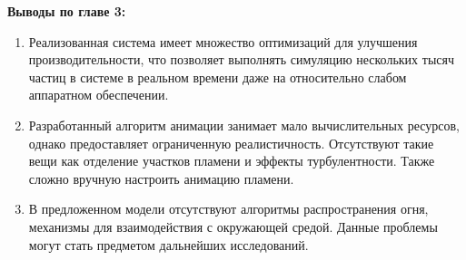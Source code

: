 \textbf{Выводы по главе 3:}
\begin{enumerate}
    \item Реализованная система имеет множество оптимизаций для улучшения
        производительности, что позволяет выполнять симуляцию нескольких тысяч
        частиц в системе в реальном времени даже на относительно слабом
        аппаратном обеспечении.
    \item Разработанный алгоритм анимации занимает мало вычислительных ресурсов,
        однако предоставляет ограниченную реалистичность. Отсутствуют такие вещи
        как отделение участков пламени и эффекты турбулентности. Также
        сложно вручную настроить анимацию пламени.
    \item В предложенном модели отсутствуют алгоритмы распространения огня,
        механизмы для взаимодействия с окружающей средой. Данные проблемы могут
        стать предметом дальнейших исследований.
\end{enumerate}
